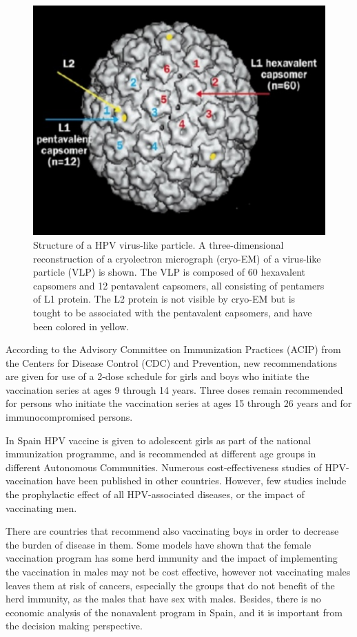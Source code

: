 \begin{figure}[ht]
	\centering
\includegraphics[scale=0.7]{IMG/cryo.png}
\caption{Structure of a HPV virus-like particle. A three-dimensional reconstruction of a cryolectron micrograph (cryo-EM) of a virus-like particle (VLP) is shown. The VLP is composed of 60 hexavalent capsomers and 12 pentavalent capsomers, all consisting of pentamers of L1 protein. The L2 protein is not visible by cryo-EM but is tought to be associated with the pentavalent capsomers, and have been colored in yellow.}
\label{cryo}
\end{figure}  

According to the Advisory Committee on Immunization Practices (ACIP) from the Centers for Disease Control (CDC) and Prevention, new recommendations are given for use of a 2-dose schedule for girls and boys who initiate the vaccination series at ages 9 through 14 years. Three doses remain recommended for persons who initiate the vaccination series at ages 15 through 26 years and for immunocompromised persons.

In Spain HPV vaccine is given to adolescent girls as part of the national immunization programme, and is recommended at different age groups in different Autonomous Communities. Numerous cost-effectiveness studies of HPV-vaccination have been published in other countries. However, few studies include the prophylactic effect of all HPV-associated diseases, or the impact of vaccinating men.

There are countries that recommend also vaccinating boys in order to decrease the burden of disease in them. Some models have shown that the female vaccination program has some herd immunity and the impact of implementing the vaccination in males may not be cost effective, however not vaccinating males leaves them at risk of cancers, especially the groups that do not benefit of the herd immunity, as the males that have sex with males.
Besides, there is no economic analysis of the nonavalent program in Spain, and it is important from the decision making perspective.

